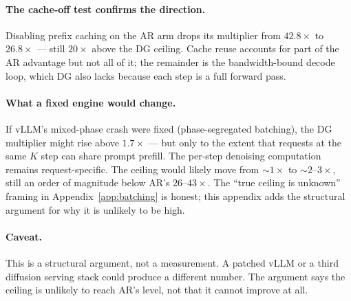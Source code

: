 \paragraph{The cache-off test confirms the direction.}
Disabling prefix caching on the AR arm drops its multiplier from
$42.8\times$ to $26.8\times$ --- still $20\times$ above the DG ceiling.
Cache reuse accounts for part of the AR advantage but not all of it; the
remainder is the bandwidth-bound decode loop, which DG also lacks because
each step is a full forward pass.

\paragraph{What a fixed engine would change.}
If vLLM's mixed-phase crash were fixed (phase-segregated batching), the
DG multiplier might rise above $1.7\times$ --- but only to the extent that
requests at the same $K$ step can share prompt prefill. The per-step
denoising computation remains request-specific. The ceiling would likely
move from $\sim 1\times$ to $\sim 2$--$3\times$, still an order of
magnitude below AR's $26$--$43\times$. The ``true ceiling is unknown''
framing in Appendix~\ref{app:batching} is honest; this appendix adds the
structural argument for why it is unlikely to be high.

\paragraph{Caveat.}
This is a structural argument, not a measurement. A patched vLLM or a
third diffusion serving stack could produce a different number. The
argument says the ceiling is unlikely to reach AR's level, not that it
cannot improve at all.
